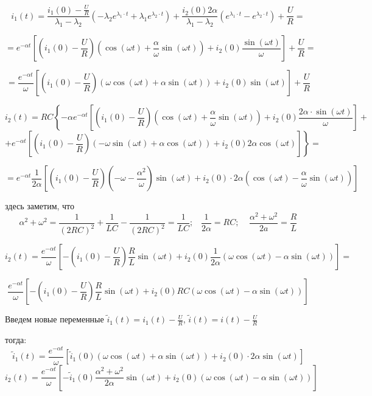 \documentclass[a4paper,12pt]{article}
\begin{document}
$$
i_1(t) = \frac{i_1(0) - \frac{U}{R}}{\lambda_1-\lambda_2} \left( -\lambda_2e^{\lambda_1 \cdot t}  + \lambda_1e^{\lambda_2 \cdot t} \right)
+\frac{i_2(0)2\alpha}{\lambda_1 - \lambda_2} \left(e^{\lambda_1\cdot t} - e^{\lambda_2\cdot t}\right)  + \frac{U}{R}=
$$

$$
= e^{-\alpha t} \left[ \left(i_1(0) - \frac{U}{R}\right)
\left(\cos(\omega t) + \frac{\alpha}{\omega} \sin(\omega t)\right)
+ i_2(0) \frac{\sin(\omega t)}{\omega} \right]  + \frac{U}{R} =
$$

$$
= \frac{e^{-\alpha t}}{\omega} \left[ \left(i_1(0) - \frac{U}{R}\right)
\left(\omega\cos(\omega t) + \alpha \sin(\omega t)\right)
+ i_2(0) \sin(\omega t) \right]  + \frac{U}{R}
$$


$$
i_2(t) = RC\left\{-\alpha e^{-\alpha t} \left[ \left(i_1(0) - \frac{U}{R}\right)
\left(\cos(\omega t) + \frac{\alpha}{\omega} \sin(\omega t)\right)
+ i_2(0) \frac{2\alpha\cdot\sin(\omega t)}{\omega} \right]\right. +
$$
$$
+ \left.e^{-\alpha t} \left[  \left(i_1(0) - \frac{U}{R}\right) 
\left(-\omega\sin(\omega t) + \alpha \cos(\omega t)\right) + i_2(0)2\alpha\cos(\omega t)
\right]\right\} =
$$

$$
=  e^{-\alpha t} \frac{1}{2\alpha} \left[ \left(i_1(0) - \frac{U}{R}\right)
\left(-\omega - \frac{\alpha^2}{\omega}\right)\sin(\omega t) + 
i_2(0)\cdot 2\alpha\left(\cos(\omega t) - \frac{\alpha}{\omega}\sin(\omega t)\right)
\right] 
$$

здесь заметим, что 
$$
\alpha^2 + \omega^2 = \frac{1}{(2RC)^2} + \frac{1}{LC} - \frac{1}{(2RC)^2} = \frac{1}{LC}; \;\;\; 
\frac{1}{2\alpha} = RC; \;\;\;\; \frac{\alpha^2+\omega^2}{2a} = \frac{R}{L}
$$


$$
i_2(t)=\frac{e^{-\alpha t}}{\omega}
\left[ -\left(i_1(0) - \frac{U}{R}\right)\frac{R}{L}\sin(\omega t) 
+ i_2(0) \frac{1}{2\alpha} \left(\omega \cos(\omega t) - \alpha\sin(\omega t)\right)
\right] =
$$

$$
\frac{e^{-\alpha t}}{\omega}
\left[ -\left(i_1(0) - \frac{U}{R}\right)\frac{R}{L}\sin(\omega t)
+ i_2(0) RC \left(\omega \cos(\omega t) - \alpha\sin(\omega t)\right)
\right]
$$

Введем новые переменные ${\displaystyle \tilde{i}_1(t) = i_1(t) - \frac{U}{R}}$,
${\displaystyle \tilde{i}(t) = i(t) - \frac{U}{R}}$

тогда:
$$
\tilde{i}_1(t) = \frac{e^{-\alpha t}}{\omega} \left[ \tilde{i}_1(0) 
\left(\omega\cos(\omega t) + \alpha \sin(\omega t)\right)
+ i_2(0)\cdot 2\alpha \sin(\omega t) \right]
$$
$$
i_2(t)=\frac{e^{-\alpha t}}{\omega}
\left[ -\tilde{i}_1(0) \frac{\alpha^2+\omega^2}{2\alpha}\sin(\omega t) +
i_2(0) \left(\omega \cos(\omega t) - \alpha\sin(\omega t)\right)
\right]
$$
\end{document}
